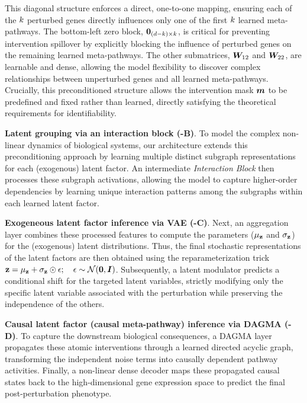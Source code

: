 This diagonal structure enforces a direct, one-to-one mapping, ensuring each of the $k$ perturbed genes directly influences only one of the first $k$ learned meta-pathways.
The bottom-left zero block, ${\bm{0}}_{(d-k) \times k}$, is critical for preventing intervention spillover by explicitly blocking the influence of perturbed genes on the remaining learned meta-pathways.
The other submatrices, ${\bm{W}}_{12}$ and ${\bm{W}}_{22}$, are learnable and dense, allowing the model flexibility to discover complex relationships between unperturbed genes and all learned meta-pathways.
Crucially, this preconditioned structure allows the intervention mask ${\bm{m}}$ to be predefined and fixed rather than learned, directly satisfying the theoretical requirements for identifiability.

\textbf{Latent grouping via an interaction block (-B)}. To model the complex non-linear dynamics of biological systems, our architecture extends this preconditioning approach by learning multiple distinct subgraph representations for each (exogenous) latent factor.
An intermediate \emph{Interaction Block} then processes these subgraph activations, allowing the model to capture higher-order dependencies by learning unique interaction patterns among the subgraphs within each learned latent factor.

\textbf{Exogeneous latent factor inference via VAE (-C)}. Next, an aggregation layer combines these processed features to compute the parameters ($\vect{\mu}_{\latentvars}$ and $\vect{\sigma}_{\latentvars}$) for the (exogenous) latent distributions.
Thus, the final stochastic representations of the latent factors are then obtained using the reparameterization trick $\latentvars = \vect{\mu}_{\latentvars} + \vect{\sigma}_{\latentvars} \odot \vect{\epsilon}; \quad \vect{\epsilon} \sim \normaldist(\vect{0}, \identitymatrix)$.
Subsequently, a latent modulator predicts a conditional shift for the targeted latent variables, strictly modifying only the specific latent variable associated with the perturbation while preserving the independence of the others.

\textbf{Causal latent factor (causal meta-pathway) inference via DAGMA (-D)}. To capture the downstream biological consequences, a DAGMA layer propagates these atomic interventions through a learned directed acyclic graph, transforming the independent noise terms into causally dependent pathway activities.
Finally, a non-linear dense decoder maps these propagated causal states back to the high-dimensional gene expression space to predict the final post-perturbation phenotype.

